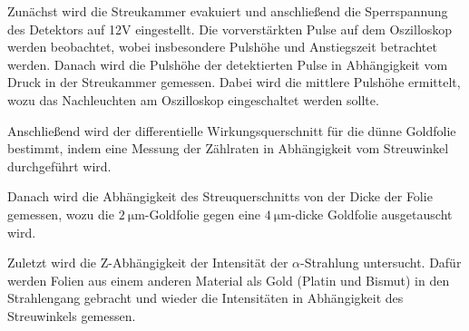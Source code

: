Zunächst wird die Streukammer evakuiert und anschließend die Sperrspannung des Detektors auf 12V eingestellt.
Die vorverstärkten Pulse auf dem Oszilloskop werden beobachtet, wobei insbesondere Pulshöhe und Anstiegszeit betrachtet werden.
Danach wird die Pulshöhe der detektierten Pulse in Abhängigkeit vom Druck in der Streukammer gemessen.
Dabei wird die mittlere Pulshöhe ermittelt, wozu das Nachleuchten am Oszilloskop eingeschaltet werden sollte.

Anschließend wird der differentielle Wirkungsquerschnitt für die dünne Goldfolie bestimmt, indem eine Messung der Zählraten
in Abhängigkeit vom Streuwinkel durchgeführt wird.

Danach wird die Abhängigkeit des Streuquerschnitts von der Dicke der Folie gemessen, wozu die
$\SI{2}{\micro\meter}$-Goldfolie gegen eine $\SI{4}{\micro\meter}$-dicke Goldfolie ausgetauscht wird.

Zuletzt wird die Z-Abhängigkeit der Intensität der $\alpha$-Strahlung untersucht. Dafür werden Folien aus einem anderen
Material als Gold (Platin und Bismut) in den Strahlengang gebracht und wieder die Intensitäten in Abhängigkeit des Streuwinkels
gemessen.
